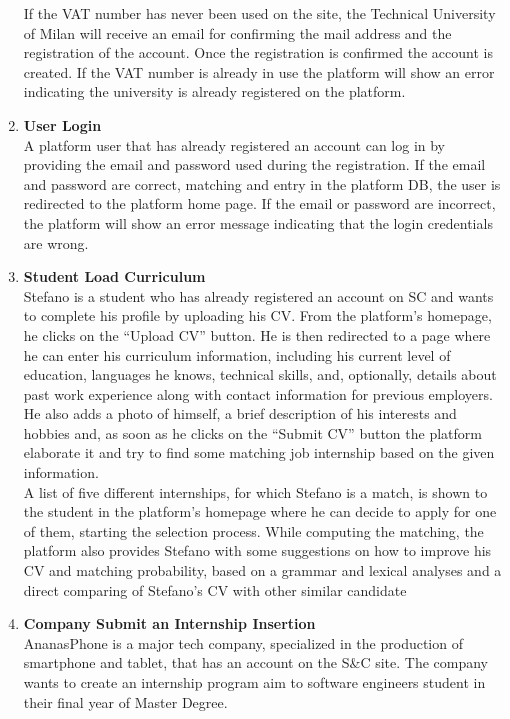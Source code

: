 \begin{enumerate}
        If the VAT number has never been used on the site, the Technical University of Milan will receive an email for confirming the mail address and the registration of the account. Once the registration is confirmed the account is created.
        If the VAT number is already in use the platform will show an error indicating the university is already registered on the platform.
    \item \textbf{User Login}\\
        A platform user that has already registered an account can log in by providing the email and password used during the registration. If the email and password are correct, matching and entry in the platform DB, the user is redirected to the platform home page. If the email or password are incorrect, the platform will show an error message indicating that the login credentials are wrong.
    \item \textbf{Student Load Curriculum}\\
        Stefano is a student who has already registered an account on SC and wants to complete his profile by uploading his CV. From the platform's homepage, he clicks on the “Upload CV” button. He is then redirected to a page where he can enter his curriculum information, including his current level of education, languages he knows, technical skills, and, optionally, details about past work experience along with contact information for previous employers.
        He also adds a photo of himself, a brief description of his interests and hobbies and, as soon as he clicks on the “Submit CV” button the platform elaborate it and try to find some matching job internship based on the given information.\\
        A list of five different internships, for which Stefano is a match, is shown to the student in the platform's homepage where he can decide to apply for one of them, starting the selection process.
        While computing the matching, the platform also provides Stefano with some suggestions on how to improve his CV and matching probability, based on a grammar and lexical analyses and a direct comparing of Stefano's CV with other similar candidate
    \item \textbf{Company Submit an Internship Insertion}\\
        AnanasPhone is a major tech company, specialized in the production of smartphone and tablet, that has an account on the S\&C site. The company wants to create an internship program aim to software engineers student in their final year of Master Degree.\\

\end{enumerate}
